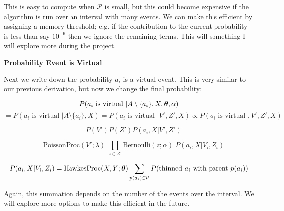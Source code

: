 \documentclass[11pt]{article}
\begin{document}
This is easy to compute when $\mathcal{P}$ is small, but this could become expensive if the algorithm is run over an interval with many events. We can make this efficient by assigning a memory threshold; e.g. if the contribution to the current probability is less than say $10^{-6}$ then we ignore the remaining terms. This will something I will explore more during the project.

\vspace{1cm}
\noindent\textbf{Probability Event is Virtual}

\noindent Next we write down the probability $a_i$ is a virtual event. This is very similar to our previous derivation, but now we change the final probability:

\[
  P(a_i \text{ is virtual } | A \setminus \{a_i\}, X, \boldsymbol{\theta}, \alpha)
\]
\[
  =
  P(a_i \text{ is virtual } | A \setminus \{a_i\}, X)
  =
  P(a_i \text{ is virtual } | V', Z', X)
  \propto
  P(a_i \text{ is virtual }, V', Z', X)
\]

\[
  =
  P(V')P(Z')P(a_i, X | V', Z')
\]

\[
  =
  \text{PoissonProc}(V'; \lambda)
  \;
  \prod_{z \in Z'}\text{Bernoulli}(z; \alpha) 
  \;
  P(a_i, X | V_i, Z_i)  
\]

\[
  P(a_i, X | V_i, Z_i)
  =
  \text{HawkesProc}(X,Y; \boldsymbol{\theta})
  \sum_{p(a_i) \in \mathcal{P}}
  P(\text{thinned } a_i \text{ with parent } p(a_i))
\]


\noindent Again, this summation depends on the number of the events over the interval. We will explore more options to make this efficient in the future.
\end{document}
